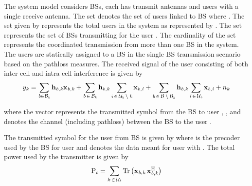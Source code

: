 
The system model considers  BSs, each has  transmit antennas and  users with a single receive antenna. The set  denotes the set of users linked to BS  where . The set  given by  represents the total users in the system as represented by . The set  represents the set of BSs transmitting for the user . The cardinality of the set  represents the coordinated transmission from more than one  BS in the system. The users are statically assigned to a BS in the single BS transmission scenario based on the pathloss measures. The received signal  of the user  consisting of both inter cell and intra cell interference is given by
\begin{equation}
{y}_{\mathit{k}} = \sum_{\mathit{b} \in \mathcal{B}_{\mathit{k}}} \mathbf{h}_{\mathit{b},\mathit{k}} \mathbf{x}_{\mathit{b},\mathit{k}} + \sum_{\mathit{b} \, \in \, \mathcal{B}_{\mathit{k}}} \mathbf{h}_{\mathit{b},\mathit{k}} \sum_{\mathit{i} \, \in \, \mathcal{U}_{\mathit{b}} \: \backslash \: \mathit{k}} \mathbf{x}_{\mathit{b},\mathit{i}} + \sum_{\mathit{b} \, \in \, \mathcal{B} \: \backslash \: \mathcal{B}_{\mathit{k}}} \mathbf{h}_{\mathit{b},\mathit{k}} \sum_{\mathit{i} \, \in \, \mathcal{U}_{\mathit{b}}} \mathbf{x}_{\mathit{b},\mathit{i}} + {n}_{\mathit{k}}
\label{sm-e1}
\end{equation}

where the vector  represents the transmitted symbol from the BS  to user , , and  denotes the channel (including pathloss) between the BS  to the user .

The transmitted symbol  for the user  from BS  is given by  where  is the precoder used by the BS  for user  and  denotes the data meant for user  with . The total power used by the transmitter is given by
\begin{equation}
\mathrm{P}_{t} = \sum_{k \, \in \, \mathcal{U}_{\mathit{b}}} \mathrm{Tr} \left ( \mathbf{x}_{\mathit{b},\mathit{k}} \, \mathbf{x}_{\mathit{b},\mathit{k}}^{\mathrm{H}} \right )
\label{sm-e2}
\end{equation}

